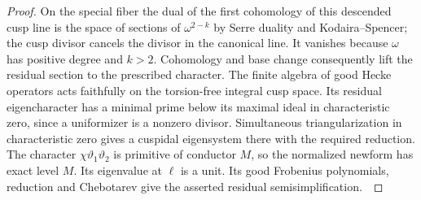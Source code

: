 \documentclass[a4paper,11pt]{article}
\theoremstyle{definition}
\theoremstyle{remark}
\numberwithin{equation}{section}
\begin{document}
\begin{proof}
On the special fiber the dual of the first cohomology of
this descended cusp line is the space of sections of
\(\omega^{2-k}\) by Serre duality and Kodaira--Spencer;
the cusp divisor cancels the divisor in the canonical line.
It vanishes because \(\omega\) has positive degree and \(k>2\).
Cohomology and base change consequently lift the residual
section to the prescribed character. The finite algebra of
good Hecke operators acts faithfully on the torsion-free
integral cusp space. Its residual eigencharacter has a
minimal prime below its maximal ideal in characteristic
zero, since a uniformizer is a nonzero divisor. Simultaneous
triangularization in characteristic zero gives a cuspidal
eigensystem there with the required reduction. The character
\(\chi\vartheta_1\vartheta_2\) is primitive of conductor
\(M\), so the normalized newform has exact level \(M\).
Its eigenvalue at \(\ell\) is a unit. Its good Frobenius
polynomials, reduction and Chebotarev give the asserted
residual semisimplification.~\cite{XI-VIII-katz361,XI-VIII-rapoport361,XI-VIII-V-newforms,XI-VIII-V-deligne}
\end{proof}
\end{document}
